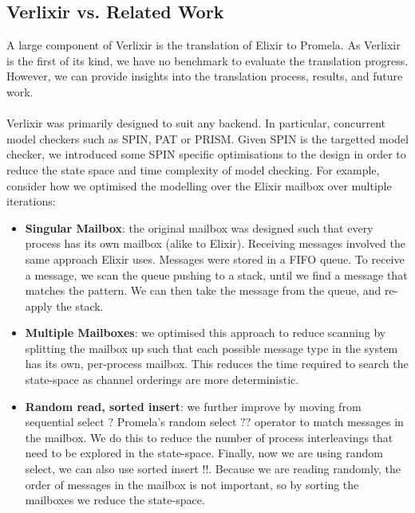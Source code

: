 \subsection{Verlixir vs. Related Work}
A large component of Verlixir is the translation of Elixir to Promela. As Verlixir is the first of its kind, we have no benchmark to evaluate the translation progress. However, we can provide insights into the translation process, results, and future work.
\\ \\
Verlixir was primarily designed to suit any backend. In particular, concurrent model checkers such as SPIN, PAT or PRISM. Given SPIN is the targetted model checker, we introduced some SPIN specific optimisations to the design in order to reduce the state space and time complexity of model checking. For example, consider how we optimised the modelling over the Elixir mailbox over multiple iterations:
\begin{itemize}
    \item \textbf{Singular Mailbox}: the original mailbox was designed such that every process has its own mailbox (alike to Elixir). Receiving messages involved the same approach Elixir uses. Messages were stored in a FIFO queue. To receive a message, we scan the queue pushing to a stack, until we find a message that matches the pattern. We can then take the message from the queue, and re-apply the stack. 
    \item \textbf{Multiple Mailboxes}: we optimised this approach to reduce scanning by splitting the mailbox up such that each possible message type in the system has its own, per-process mailbox. This reduces the time required to search the state-space as channel orderings are more deterministic. 
    \item \textbf{Random read, sorted insert}: we further improve by moving from sequential select $?$ Promela's random select $??$ operator to match messages in the mailbox. We do this to reduce the number of process interleavings that need to be explored in the state-space. Finally, now we are using random select, we can also use sorted insert $!!$. Because we are reading randomly, the order of messages in the mailbox is not important, so by sorting the mailboxes we reduce the state-space. 
\end{itemize}
